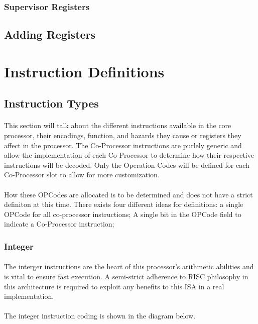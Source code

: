 \documentclass[letterpaper, 11pt]{article}
\begin{document}
\subsubsection{Supervisor Registers}
\subsection{Adding Registers}


\section{Instruction Definitions}
\subsection{Instruction Types}
\paragraph{}This section will talk about the different instructions available in the core processor, their encodings, function, and hazards
they cause or registers they affect in the processor. The Co-Processor instructions are purlely generic and allow the implementation of
each Co-Processor to determine how their respective instructions will be decoded. Only the Operation Codes will be defined for each 
Co-Processor slot to allow for more customization.
\paragraph{}How these OPCodes are allocated is to be determined and does not have a strict definiton
at this time. There exists four different ideas for definitions: a single OPCode for all co-processor instructions; A single bit in the OPCode field
to indicate a Co-Processor instruction; 
\subsubsection{Integer}
\paragraph{}The interger instructions are the heart of this processor's arithmetic abilities and is vital to ensure fast execution. A semi-strict
adherence to RISC philosophy in this architecture is required to exploit any benefits to this ISA in a real implementation.
\paragraph{}The integer instruction coding is shown in the diagram below.
\end{document}
